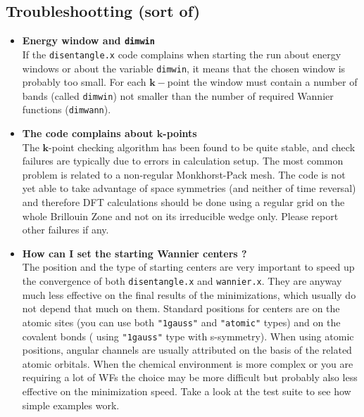 \subsection{Troubleshootting (sort of)}
\label{subsec:troubleshoot}

%
%
\begin{itemize}
\item   {\bf Energy window and {\tt dimwin}} \\
        If the {\tt disentangle.x} code complains when starting the run about
        energy windows or about the variable {\tt dimwin}, it means that the chosen window
        is probably too small.  For each $\mathbf{k}-$point the window
        must contain a number of bands (called {\tt dimwin}) not smaller than
        the number of required Wannier functions ({\tt dimwann}).

\item   {\bf The code complains about $\mathbf{k}$-points} \\
        The $\mathbf{k}$-point checking algorithm has been found to be quite stable,
        and check failures are typically due to errors in calculation setup.
        The most common problem is related to a non-regular Monkhorst-Pack 
        mesh. The code is not yet able to take advantage of space symmetries (and
        neither of time reversal) and therefore DFT calculations should be done using
        a regular grid on the whole Brillouin Zone and not on its irreducible wedge only.
        Please report other failures if any.

\item   {\bf How can I set the starting Wannier centers ? } \\
        The position and the type of starting centers are very important to speed up
        the convergence of both {\tt disentangle.x} and {\tt wannier.x}. They are
        anyway much less effective on the final results of the minimizations,
        which usually do not depend that much on them. Standard positions for
        centers are on the atomic sites (you can use both {\tt "1gauss"} and
        {\tt "atomic"} types) and on the covalent bonds ( using {\tt "1gauss"} type
        with s-symmetry). When using atomic positions, angular channels are usually
        attributed on the basis of the related atomic orbitals.
        When the chemical environment is more complex or you are
        requiring a lot of WFs the choice may be more difficult but probably also
        less effective on the minimization speed. Take a look at the
        test suite to see how simple examples work.


\end{itemize}
